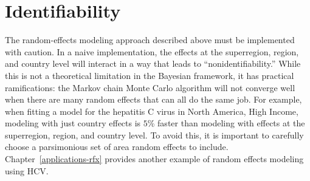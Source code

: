 \section{Identifiability}
The random-effects modeling approach described above must be
implemented with caution.  In a naive implementation, the effects at
the superregion, region, and country level will interact in a way
that leads to ``nonidentifiability.''  While this is not a
theoretical limitation in the Bayesian framework, it has practical
ramifications: the Markov chain Monte Carlo algorithm will not converge well when there
are many random effects that can all do the same job.  For example, 
when fitting a model for the hepatitis C virus in North America, High Income,
modeling with just country effects is $5$\% faster than modeling with
effects at the superregion, region, and country level. To avoid this,
it is important to carefully choose a parsimonious set of area random effects to include.
Chapter~\ref{applications-rfx} provides another example of random effects modeling using HCV.
